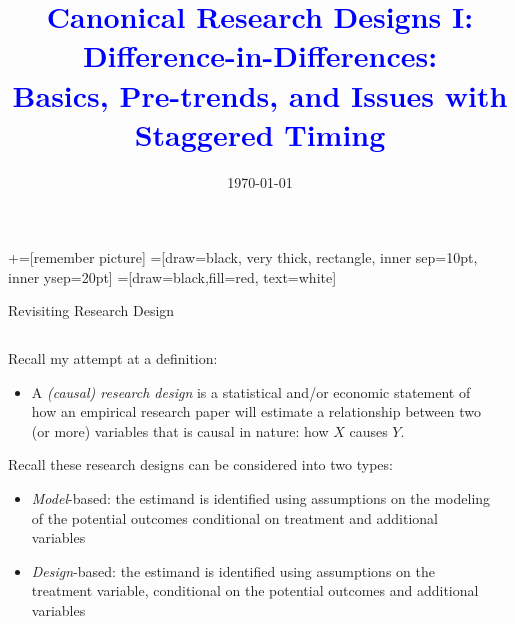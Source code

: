 \documentclass[notes,11pt, aspectratio=169]{beamer}
\title[]{\textcolor{blue}{Canonical Research Designs I:\\ Difference-in-Differences:\\ Basics, Pre-trends, and Issues with Staggered Timing}}
\author[PGP]{}
\institute[FRBNY]{\small{\begin{tabular}{c}
  Paul Goldsmith-Pinkham  \\
\end{tabular}}}
\date{\today}
\newenvironment{wideitemize}{\itemize\addtolength{\itemsep}{10pt}}{\enditemize}
\begin{document}
\newcommand\marktopleft[1]{%
    \tikz[overlay,remember picture] 
        \node (marker-#1-a) at (-.3em,.3em) {};%
}
\newcommand\markbottomright[2]{%
    \tikz[overlay,remember picture] 
        \node (marker-#1-b) at (0em,0em) {};%
}
+=[remember picture] 
 =[draw=black, very thick, rectangle, inner sep=10pt, inner ysep=20pt]
 =[draw=black,fill=red, text=white]

\begin{frame}
\maketitle
\end{frame}

\begin{frame}{Revisiting Research Design}
  \begin{columns}[T] %
    \begin{column}{0.8\textwidth}
      \begin{wideitemize}
      \item Recall my attempt at a definition:
        \begin{itemize}
        \item A \emph{(causal) research design} is a statistical and/or economic
          statement of how an empirical research paper will estimate a
          relationship between two (or more) variables that is causal in nature: how $X$ causes $Y$.
      \end{itemize}
    \item Recall these research designs can be considered into two types:
      \begin{itemize}
      \item \emph{Model}-based: the estimand is identified using
        assumptions on the modeling of the potential outcomes
        conditional on treatment and additional variables
       \item\emph{Design}-based: the estimand is
         identified using assumptions on the treatment variable,
         conditional on the potential outcomes and additional
         variables
        \end{itemize}
      \end{wideitemize}
    \end{column}%
    \hfill%
    \begin{column}{.5\textwidth}
    \end{column}%
  \end{columns}
\end{frame}
\end{document}
